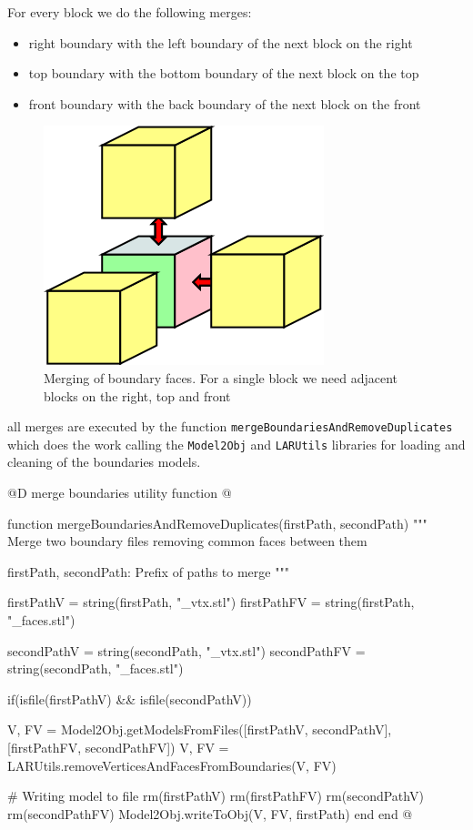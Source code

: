 \documentclass[11pt,oneside]{article}	%
\begin{document}
For every block we do the following merges:
\begin{itemize}
 \item right boundary with the left boundary of the next block on the right
 \item top boundary with the bottom boundary of the next block on the top
 \item front boundary with the back boundary of the next block on the front
\end{itemize}

\begin{figure}[htb] %
   \centering
   \includegraphics[width=0.30\linewidth]{images/BoundaryMergeIteration.png}
   \caption{Merging of boundary faces. For a single block we need adjacent blocks on the right, top and front}
   \label{fig:boundaryMergeIteration}
\end{figure}

all merges are executed by the function \texttt{mergeBoundariesAndRemoveDuplicates} which does the work calling the \texttt{Model2Obj} and \texttt{LARUtils} libraries for loading and cleaning of the boundaries models.

@D merge boundaries utility function
@{function mergeBoundariesAndRemoveDuplicates(firstPath, secondPath)
  """
  Merge two boundary files removing common faces between
  them

  firstPath, secondPath: Prefix of paths to merge
  """

  firstPathV = string(firstPath, "_vtx.stl")
  firstPathFV = string(firstPath, "_faces.stl")

  secondPathV = string(secondPath, "_vtx.stl")
  secondPathFV = string(secondPath, "_faces.stl")

  if(isfile(firstPathV) && isfile(secondPathV))

    V, FV = Model2Obj.getModelsFromFiles([firstPathV, secondPathV],
					 [firstPathFV, secondPathFV])
    V, FV = LARUtils.removeVerticesAndFacesFromBoundaries(V, FV)

    # Writing model to file
    rm(firstPathV)
    rm(firstPathFV)
    rm(secondPathV)
    rm(secondPathFV)
    Model2Obj.writeToObj(V, FV, firstPath)
  end
end @}
\end{document}
